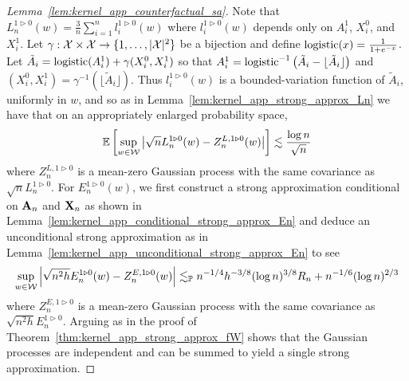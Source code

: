 \begin{proof}[Lemma~\ref{lem:kernel_app_counterfactual_sa}]

  Note that
  $L_n^{1 \triangleright 0}(w)
  = \frac 3n \sum_{i=1}^n l_i^{1 \triangleright 0}(w)$
  where $l_i^{1 \triangleright 0}(w)$ depends only on
  $A_i^1$, $X_i^0$, and $X_i^1$.
  Let $\gamma: \mathcal{X} \times \mathcal{X} \to \{1, \ldots, |\mathcal{X}|^2\}$
  be a bijection and
  define $\operatorname*{logistic}(x) = \frac{1}{1+e^{-x}}$.
  Let
  $\tilde A_i = \operatorname*{logistic}(A_i^1) + \gamma(X_i^0, X_i^1)$
  so that
  $A_i^1 = \operatorname*{logistic}^{-1}\big(\tilde A_i
  - \lfloor \tilde A_i \rfloor\big)$
  and
  $(X_i^0, X_i^1) = \gamma^{-1}(\lfloor \tilde A_i \rfloor)$.
  Thus
  $l_i^{1 \triangleright 0}(w)$ is a bounded-variation function
  of $\tilde A_i$, uniformly in $w$, and so as in
  Lemma~\ref{lem:kernel_app_strong_approx_Ln} we have that
  on an appropriately enlarged probability space,
  \begin{align*}
    \mathbb{E}\left[
      \sup_{w \in \mathcal{W}}
      \left|
      \sqrt n L_n^{1 \triangleright 0}(w)
      - Z_n^{L, 1 \triangleright 0}(w)
      \right|
    \right]
    \lesssim
    \frac{\log n}{\sqrt n}
  \end{align*}
  where $Z_n^{L, 1 \triangleright 0}$ is a mean-zero
  Gaussian process with the same covariance as
  $\sqrt n L_n^{1 \triangleright 0}$.
  For $E_n^{1 \triangleright 0}(w)$,
  we first construct a strong approximation conditional on
  $\mathbf{A}_n$ and $\mathbf{X}_n$ as shown in
  Lemma~\ref{lem:kernel_app_conditional_strong_approx_En}
  and deduce an unconditional strong approximation as in
  Lemma~\ref{lem:kernel_app_unconditional_strong_approx_En} to see
  \begin{align*}
    \sup_{w \in \mathcal{W}}
    \left|
    \sqrt{n^2h} E_n^{1 \triangleright 0}(w)
    - Z_n^{E, 1 \triangleright 0}(w)
    \right|
    \lesssim_{\mathbb{P}}
    n^{-1/4} h^{-3/8} (\log n)^{3/8} R_n
    + n^{-1/6} (\log n)^{2/3}
  \end{align*}
  where $Z_n^{E, 1 \triangleright 0}$ is a mean-zero
  Gaussian process with the same covariance as
  $\sqrt{n^2h} E_n^{1 \triangleright 0}$.
  Arguing as in the proof of Theorem~\ref{thm:kernel_app_strong_approx_fW}
  shows that the Gaussian processes are independent
  and can be summed to yield a single strong approximation.
\end{proof}

